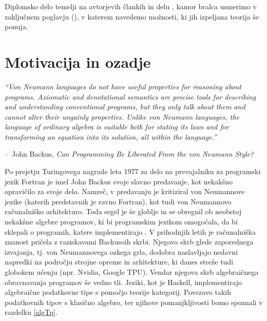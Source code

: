 \documentclass[a4paper, 12pt]{book}
\makeatletter
\newenvironment{chapquote}[2][2em]
  {\setlength{\@tempdima}{#1}%
   \def\chapquote@author{#2}%
   \parshape 1 \@tempdima \dimexpr\textwidth-2\@tempdima\relax%
   \itshape}
  {\par\normalfont\hfill--\ \chapquote@author\hspace*{\@tempdima}\par\bigskip}
\makeatother
\begin{document}
Diplomsko delo temelji na avtorjevih člankih \cite{opCalProg} \cite{dC++Paper} in delu \cite{dC++}\cite{dC++Man}, kamor bralca usmerimo v zaključnem poglavju (\emph{}), v katerem navedemo možnosti, ki jih izpeljana teorija še ponuja.

\chapter{Motivacija in ozadje}
\label{ch:MotivacijaInOzadje}

\begin{chapquote}{\small{John Backus, \textit{Can Programming Be Liberated From the von Neumann Style?}}}
``Von Neumann languages do not have useful properties for reasoning about programs. Axiomatic and denotational semantics are precise tools for describing and understanding conventional programs, but they only talk about them and cannot alter their ungainly properties. Unlike von Neumann languages, the language of ordinary algebra is suitable both for stating its laws and for transforming an equation into its solution, all within the language.''
\end{chapquote}

Po prejetju Turingovega nagrade leta 1977 za delo na prevajalniku za programski jezik Fortran je imel John Backus svoje slavno predavanje, kot nekakšno opravičilo za svoje delo. Namreč, v predavanju je kritiziral von Neumannove jezike (katerih predstavnik je ravno Fortran), kot tudi von Neumannovo računalniško arhitekturo. Toda segel je še globlje in se obregnil ob neobstoj nekakšne algebre programov, ki bi programskim jezikom omogočala, da bi sklepali o programih, katere implementirajo \cite{backus}.
V prihodnjih letih je računalniška znanost pričela z raziskavami Backusoih skrbi. Njegovo skrb glede zaporednega izvajanja, tj. von Neumannovega ozkega grla, dodobra naslavljajo nedavni napredki na področju strojne opreme in arhitekture, ki danes streže tudi globokem učenju (npr. Nvidia, Google TPU). Vendar njegova skrb algebraičnega obravnavanja programov še vedno tli. Jeziki, kot je Haskell, implementirajo algebraične podatkovne tipe s pomočjo teorije kategorij. Povezavo takih podatkovnih tipov s klasično algebro, ter njihove pomanjkljivosti bomo spoznali v razdelku \ref{algTp}.
\end{document}
